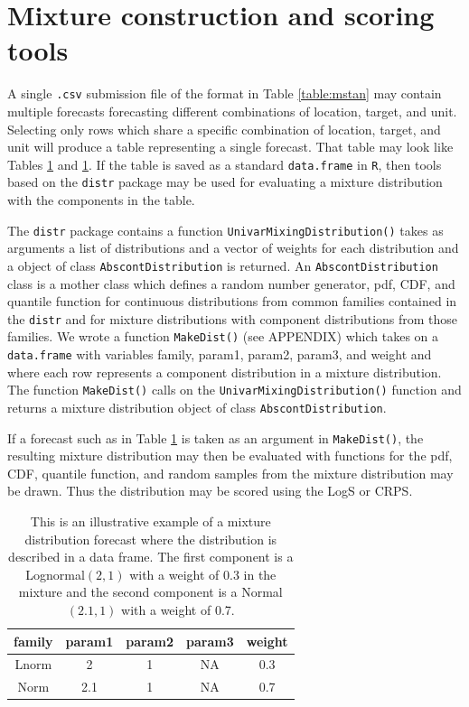 \documentclass[11pt,notitlepage]{isuthesis}
\begin{document}
\section{Mixture construction and scoring tools}
\label{section:tools}

A single \texttt{.csv} submission file of the format in Table \ref{table:mstan} 
may contain multiple forecasts forecasting different combinations of location,
target, and unit. Selecting only rows which share a specific combination of 
location, target, and unit will produce a table representing a single forecast.
That table may look like Tables \ref{tab:preddf1} and 
\ref{tab:preddf1}. If the table is saved as a standard \texttt{data.frame} in 
\texttt{R}, then tools based on the \texttt{distr} package 
\cite{camphausen2007distr} may be used for evaluating a mixture distribution 
with the components in the table. 


The \texttt{distr} package contains a function 
\texttt{UnivarMixingDistribution()} takes as arguments a list of distributions
and a vector of weights for each distribution and a object of class 
\texttt{AbscontDistribution} is returned. An \texttt{AbscontDistribution} class
is a mother class which defines a random number generator, pdf,
CDF, and quantile function for continuous distributions from common
families contained in the \texttt{distr} and for mixture distributions with 
component distributions from those families.
We wrote a function \texttt{MakeDist()} (see APPENDIX)
which takes on a \texttt{data.frame} with variables
family, param1, param2, param3, and weight and where each row represents a
component distribution in a mixture distribution. The function 
\texttt{MakeDist()} calls on the \texttt{UnivarMixingDistribution()} function
and returns a mixture distribution object of class \texttt{AbscontDistribution}.

If a forecast such as in Table \ref{tab:preddf1} is taken as an argument in 
\texttt{MakeDist()}, the resulting mixture distribution may then be evaluated 
with functions for the pdf, CDF, quantile function, and random samples from the
mixture distribution may be drawn. Thus the distribution may be scored using the
LogS or CRPS.



\begin{table}[h!]
\centering
 \begin{tabular}{|c|c|c|c|c|}
 \hline
    family & param1 & param2 & param3 & weight
    \\ \hline
    Lnorm & 2 & 1 & NA & 0.3  \\
    Norm & 2.1 & 1 & NA & 0.7 \\
 \hline
 \end{tabular}
  \begin{minipage}{11cm}
\captionsetup{font=scriptsize}
 \caption[Illustrative forecast 1]{This is an illustrative example of a
 mixture distribution
 forecast where the distribution is described in a data frame. The first 
 component is a Lognormal$(2,1)$ with a weight of 0.3 in the mixture and the 
 second component is a Normal$(2.1,1)$ with a weight of 0.7.}
 \label{tab:preddf1}
 \end{minipage}
\end{table}
\end{document}
